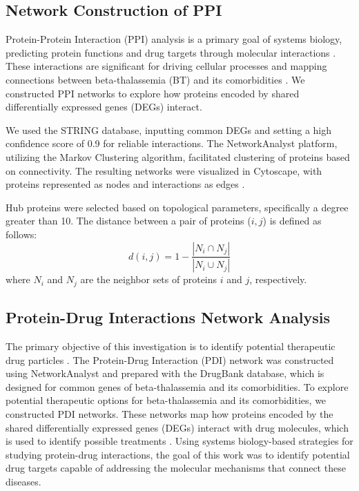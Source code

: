 \vspace*{-\parskip}
\subsection{Network Construction of PPI}
\label{sec:ppi_network}

Protein-Protein Interaction (PPI) analysis is a primary goal of systems biology, predicting protein functions and drug targets through molecular interactions \cite{b15}. These interactions are significant for driving cellular processes and mapping connections between beta-thalassemia (BT) and its comorbidities \cite{b30}. We constructed PPI networks to explore how proteins encoded by shared differentially expressed genes (DEGs) interact.

We used the STRING database, inputting common DEGs and setting a high confidence score of 0.9 for reliable interactions. The NetworkAnalyst platform, utilizing the Markov Clustering algorithm, facilitated clustering of proteins based on connectivity. The resulting networks were visualized in Cytoscape, with proteins represented as nodes and interactions as edges \cite{b18}.

Hub proteins were selected based on topological parameters, specifically a degree greater than 10. The distance between a pair of proteins (\( i, j \)) is defined as follows:
\begin{equation}
d(i,j) = 1 - \frac{|N_i \cap N_j|}{|N_i \cup N_j|}
\label{eq:protein_distance}
\end{equation}
where \( N_i \) and \( N_j \) are the neighbor sets of proteins \( i \) and \( j \), respectively.

\vspace*{-\parskip}
\subsection{Protein-Drug Interactions Network Analysis}
\label{sec:pdi_network}

The primary objective of this investigation is to identify potential therapeutic drug particles \cite{b18}. The Protein-Drug Interaction (PDI) network was constructed using NetworkAnalyst and prepared with the DrugBank database, which is designed for common genes of beta-thalassemia and its comorbidities. To explore potential therapeutic options for beta-thalassemia and its comorbidities, we constructed PDI networks. These networks map how proteins encoded by the shared differentially expressed genes (DEGs) interact with drug molecules, which is used to identify possible treatments \cite{b34}. Using systems biology-based strategies for studying protein-drug interactions, the goal of this work was to identify potential drug targets capable of addressing the molecular mechanisms that connect these diseases.

